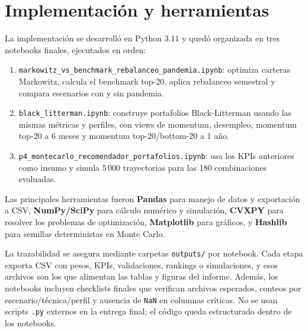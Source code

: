 \section{Implementaci\'on y herramientas}

La implementaci\'on se desarroll\'o en Python 3.11 y qued\'o organizada en tres
notebooks finales, ejecutados en orden:

\begin{enumerate}
    \item \texttt{markowitz\_vs\_benchmark\_rebalanceo\_pandemia.ipynb}:
    optimiza carteras Markowitz, calcula el benchmark top-20, aplica rebalanceo
    semestral y compara escenarios con y sin pandemia.

    \item \texttt{black\_litterman.ipynb}: construye portafolios
    Black-Litterman usando las mismas m\'etricas y perfiles, con views de
    momentum, desempleo, momentum top-20 a 6 meses y momentum top-20/bottom-20
    a 1 a\~no.

    \item \texttt{p4\_montecarlo\_recomendador\_portafolios.ipynb}: usa los
    KPIs anteriores como insumo y simula 5\,000 trayectorias para las 180
    combinaciones evaluadas.
\end{enumerate}

Las principales herramientas fueron \textbf{Pandas} para manejo de datos y
exportaci\'on a CSV, \textbf{NumPy/SciPy} para c\'alculo num\'erico y
simulaci\'on, \textbf{CVXPY} para resolver los problemas de optimizaci\'on,
\textbf{Matplotlib} para gr\'aficos, y \textbf{Hashlib} para semillas
deterministas en Monte Carlo.

La trazabilidad se asegura mediante carpetas \texttt{outputs/} por notebook.
Cada etapa exporta CSV con pesos, KPIs, validaciones, rankings o simulaciones,
y esos archivos son los que alimentan las tablas y figuras del informe. Adem\'as,
los notebooks incluyen checklists finales que verifican archivos esperados,
conteos por escenario/t\'ecnica/perfil y ausencia de \texttt{NaN} en columnas
cr\'iticas. No se usan scripts \texttt{.py} externos en la entrega final; el
c\'odigo queda estructurado dentro de los notebooks.
